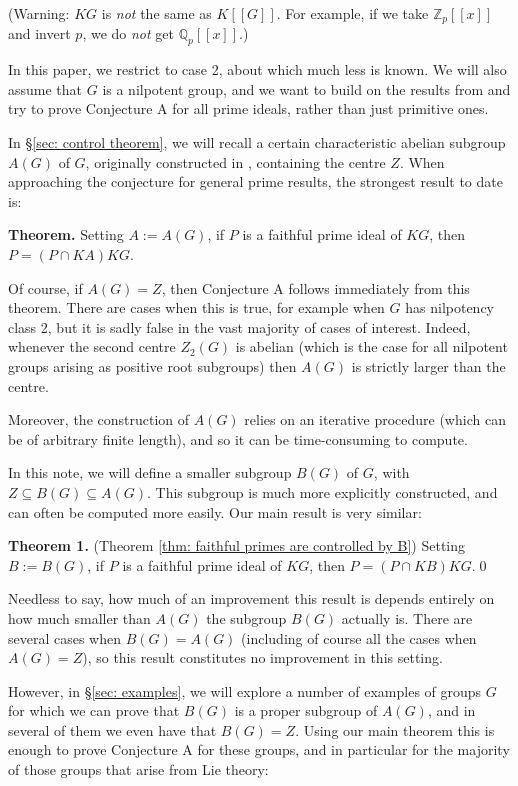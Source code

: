 \documentclass[12pt,a4paper]{article}
\theoremstyle{definition}
\theoremstyle{remark}
\theoremstyle{custthm}
\begin{document}
(Warning: $KG$ is \emph{not} the same as $K[[G]]$. For example, if we take $\mathbb{Z}_p[[x]]$ and invert $p$, we do \emph{not} get $\mathbb{Q}_p[[x]]$.)

In this paper, we restrict to case 2, about which much less is known. We will also assume  that $G$ is a nilpotent group, and we want to build on the results from \cite{jones-primitive-ideals} and try to prove Conjecture A for all prime ideals, rather than just primitive ones.

In \S \ref{sec: control theorem}, we will recall a certain characteristic abelian subgroup $A(G)$ of $G$, originally constructed in \cite[\S 3.5]{jones-primitive-ideals}, containing the centre $Z$. When approaching the conjecture for general prime results, the strongest result to date is:

\textbf{Theorem.} \cite[Theorem B]{jones-primitive-ideals} Setting $A:=A(G)$, if $P$ is a faithful prime ideal of $KG$, then $P = (P \cap KA)KG$.

Of course, if $A(G)=Z$, then Conjecture A follows immediately from this theorem. There are cases when this is true, for example when $G$ has nilpotency class 2, but it is sadly false in the vast majority of cases of interest. Indeed, whenever the second centre $Z_2(G)$ is abelian (which is the case for all nilpotent groups arising as positive root subgroups) then $A(G)$ is strictly larger than the centre.

Moreover, the construction of $A(G)$ relies on an iterative procedure (which can be of arbitrary finite length), and so it can be time-consuming to compute.

In this note, we will define a smaller subgroup $B(G)$ of $G$, with $Z\subseteq B(G)\subseteq A(G)$. This subgroup is much more explicitly constructed, and can often be computed more easily. Our main result is very similar:

\textbf{Theorem 1.} (Theorem \ref{thm: faithful primes are controlled by B}) Setting $B:=B(G)$, if $P$ is a faithful prime ideal of $KG$, then $P = (P \cap KB)KG$.\qed

Needless to say, how much of an improvement this result is depends entirely on how much smaller than $A(G)$ the subgroup $B(G)$ actually is. There are several cases when $B(G)=A(G)$ (including of course all the cases when $A(G)=Z$), so this result constitutes no improvement in this setting.

However, in \S \ref{sec: examples}, we will explore a number of examples of groups $G$ for which we can prove that $B(G)$ is a proper subgroup of $A(G)$, and in several of them we even have that $B(G)=Z$. Using our main theorem this is enough to prove Conjecture A for these groups, and in particular for the majority of those groups that arise from Lie theory:
\end{document}
